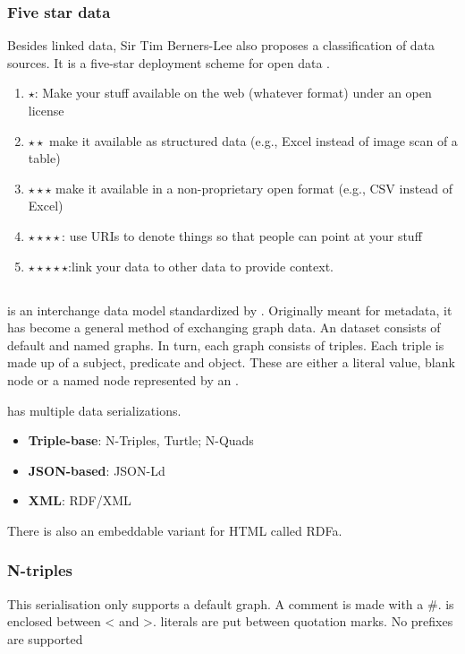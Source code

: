 \subsubsection{Five star data}
Besides linked data, Sir Tim Berners-Lee also proposes a classification of data sources. It is a five-star deployment scheme for open data \cite{noauthor_5-star_nodate}.

\begin{enumerate}
    \item $\star$: Make your stuff available on the web (whatever format) under an open license
    \item $\star\star$ make it available as structured data (e.g., Excel instead of image scan of a table)
    \item $\star\star\star$ make it available in a non-proprietary open format (e.g., CSV instead of Excel)
    \item $\star\star\star\star$: use URIs to denote things so that people can point at your stuff
    \item $\star\star\star\star\star$:link your data to other data to provide context.
\end{enumerate}
\subsection{}
 is an interchange data  model standardized by . Originally meant for metadata, it has become a general method of exchanging graph data. An  dataset consists of default and named graphs. In turn, each graph consists of  triples. Each triple is made up of a subject, predicate and object. These are either a literal value, blank node or a named node represented by an .

 has multiple data serializations.
\begin{itemize}
    \item \textbf{Triple-base}: N-Triples, Turtle; N-Quads
    \item \textbf{JSON-based}: JSON-Ld
    \item \textbf{XML}: RDF/XML
\end{itemize}
There is also an embeddable variant for HTML called RDFa. 

\subsubsection{N-triples}
This serialisation only supports a default graph. A comment is made with a \#.  is enclosed between < and >. literals are put between quotation marks. No prefixes are supported
